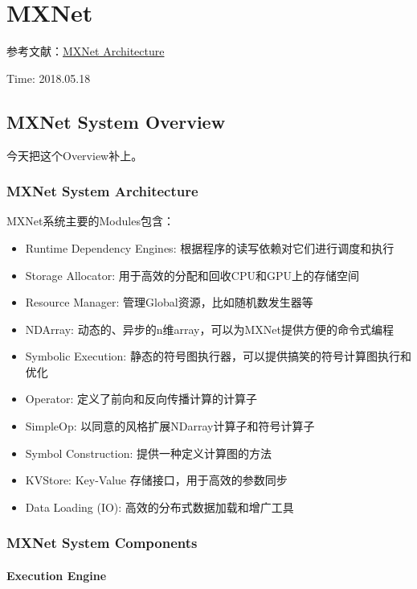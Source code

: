 \chapter{MXNet}

参考文献：\href{https://mxnet.incubator.apache.org/architecture/index.html}{MXNet Architecture}

{\color{red}Time: 2018.05.18}

\section{MXNet System Overview}

今天把这个Overview补上。

\subsection{MXNet System Architecture}

MXNet系统主要的Modules包含：

\begin{itemize}
\item Runtime Dependency Engines: 根据程序的读写依赖对它们进行调度和执行
\item Storage Allocator: 用于高效的分配和回收CPU和GPU上的存储空间
\item Resource Manager: 管理Global资源，比如随机数发生器等
\item NDArray: 动态的、异步的n维array，可以为MXNet提供方便的命令式编程
\item Symbolic Execution: 静态的符号图执行器，可以提供搞笑的符号计算图执行和优化
\item Operator: 定义了前向和反向传播计算的计算子
\item SimpleOp: 以同意的风格扩展NDarray计算子和符号计算子 
\item Symbol Construction: 提供一种定义计算图的方法
\item KVStore: Key-Value 存储接口，用于高效的参数同步
\item Data Loading (IO): 高效的分布式数据加载和增广工具 
\end{itemize}

\subsection{MXNet System Components}

\subsubsection{Execution Engine}

